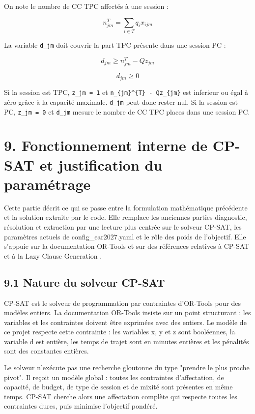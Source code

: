 \documentclass[11pt,a4paper]{article}
\begin{document}
On note le nombre de CC TPC affectés à une session :

\[
n_{jm}^{T}
=
\sum_{i\in T} q_i x_{ijm}
\]

La variable \texttt{d\_jm} doit couvrir la part TPC présente dans une session PC :

\[
d_{jm} \geq n_{jm}^{T} - Qz_{jm}
\]

\[
d_{jm} \geq 0
\]

Si la session est TPC, \texttt{z\_jm = 1} et \texttt{n\_\{jm\}\textasciicircum{}\{T\} - Qz\_\{jm\}} est inferieur ou égal à zéro grâce à la capacité maximale. \texttt{d\_jm} peut donc rester nul. Si la session est PC, \texttt{z\_jm = 0} et \texttt{d\_jm} mesure le nombre de CC TPC places dans une session PC.

\section{9. Fonctionnement interne de CP-SAT et justification du paramétrage}

Cette partie décrit ce qui se passe entre la formulation mathématique précédente et la solution extraite par le code. Elle remplace les anciennes parties diagnostic, résolution et extraction par une lecture plus centrée sur le solveur CP-SAT, les paramètres actuels de config\_ear2027.yaml et le rôle des poids de l'objectif. Elle s'appuie sur la documentation OR-Tools et sur des références relatives à CP-SAT et à la Lazy Clause Generation \cite{ortools-cpsat,ortools-limits,krupke-cpsat-primer,ohrimenko-lcg,schutt-rcpsp-lcg}.

\subsection{9.1 Nature du solveur CP-SAT}

CP-SAT est le solveur de programmation par contraintes d'OR-Tools pour des modèles entiers. La documentation OR-Tools insiste sur un point structurant : les variables et les contraintes doivent être exprimées avec des entiers. Le modèle de ce projet respecte cette contrainte : les variables x, y et z sont booléennes, la variable d est entière, les temps de trajet sont en minutes entières et les pénalités sont des constantes entières.

Le solveur n'exécute pas une recherche gloutonne du type "prendre le plus proche pivot". Il reçoit un modèle global : toutes les contraintes d'affectation, de capacité, de budget, de type de session et de mixité sont présentes en même temps. CP-SAT cherche alors une affectation complète qui respecte toutes les contraintes dures, puis minimise l'objectif pondéré.
\end{document}
